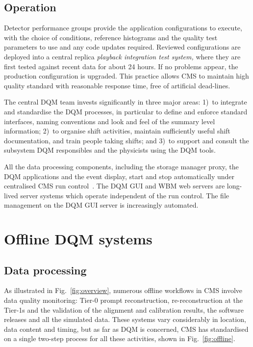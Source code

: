 \documentclass[a4paper]{jpconf}
\begin{document}
\subsection{Operation}

Detector performance groups provide the application configurations to execute,
with the choice of conditions, reference histograms and the quality test
parameters to use and any code updates required.  Reviewed configurations are
deployed into a central replica {\em playback integration test system,} where
they are first tested against recent data for about 24 hours.  If no problems
appear, the production configuration is upgraded.  This practice allows CMS to
maintain high quality standard with reasonable response time, free of
artificial dead-lines.

The central DQM team invests significantly in three major areas: 1)~to
integrate and standardise the DQM processes, in particular to define and
enforce standard interfaces, naming conventions and look and feel of the
summary level information; 2)~to organise shift activities, maintain
sufficiently useful shift documentation, and train people taking shifts; and
3)~to support and consult the subsystem DQM responsibles and the physicists
using the DQM tools.

All the data processing components, including the storage manager proxy, the
DQM applications and the event display, start and stop automatically under
centralised CMS run control~\cite{runcontrol}.  The DQM GUI and WBM web
servers are long-lived server systems which operate independent of the run
control.  The file management on the DQM GUI server is increasingly automated.


\section{Offline DQM systems}
\subsection{Data processing}

As illustrated in Fig.~\ref{fig:overview}, numerous offline workflows in CMS
involve data quality monitoring: Tier-0 prompt reconstruction,
re-reconstruction at the Tier-1s and the validation of the alignment and
calibration results, the software releases and all the simulated data.  These
systems vary considerably in location, data content and timing, but as far as
DQM is concerned, CMS has standardised on a single two-step process for all
these activities, shown in Fig.~\ref{fig:offline}.
\end{document}
